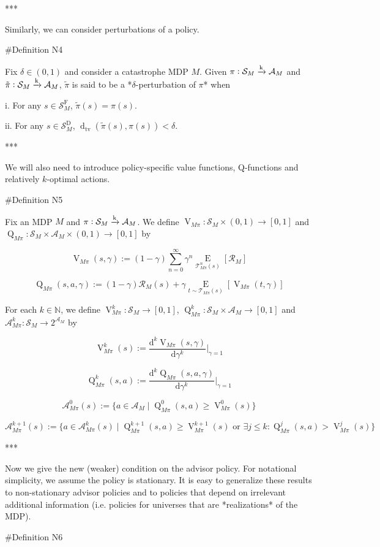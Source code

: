 \documentclass[a4paper]{article}
\newcommand{\AP}[1]{\left(#1\right)}
\newcommand{\AB}[1]{\left[#1\right]}
\newcommand{\Ea}[2]{\underset{#1}{\operatorname{E}}\AB{#2}}
\newcommand{\D}{\mathrm{d}}
\newcommand{\Dtva}[1]{\operatorname{d}_{\text{tv}}\AP{#1}}
\newcommand{\Nats}{\mathbb{N}}
\newcommand{\M}{\xrightarrow{\textnormal{k}}}
\newcommand{\A}{\mathcal{A}}
\newcommand{\St}{\mathcal{S}}
\newcommand{\T}{\mathcal{T}}
\newcommand{\R}{\mathcal{R}}
\newcommand{\RMD}{\mathrm{D}}
\newcommand{\RMF}{\mathrm{F}}
\newcommand{\SF}{\St^{\RMF}}
\newcommand{\SD}{\St^{\RMD}}
\newcommand{\V}{\operatorname{V}}
\newcommand{\Q}{\operatorname{Q}}
\begin{document}
***

Similarly, we can consider perturbations of a policy.

\#Definition N4

Fix $\delta\in(0,1)$ and consider a catastrophe MDP $M$. Given $\pi: \St_M \M \A_M$ and $\tilde{\pi}: \St_M \M \A_M$, $\tilde{\pi}$ is said to be a *$\delta$-perturbation of $\pi$* when

i. For any $s \in \SF_M$, $\tilde{\pi}(s) = \pi(s)$.

ii. For any $s \in \SD_M$, $\Dtva{\tilde{\pi}(s),\pi(s)} < \delta$.

***

We will also need to introduce policy-specific value functions, Q-functions and relatively $k$-optimal actions.

\#Definition N5

Fix an MDP $M$ and $\pi: \St_M \M \A_M$. We define $\V_{M\pi}: \St_M \times (0,1) \rightarrow [0,1]$ and $\Q_{M\pi}: \St_M \times \A_M \times (0,1) \rightarrow [0,1]$ by

$$\V_{M\pi}(s,\gamma) := (1-\gamma) \sum_{n=0}^\infty \gamma^n \Ea{\T_{M\pi}^n(s)}{\R_M}$$

$$\Q_{M\pi}(s,a,\gamma) := (1-\gamma) \R_M(s) + \gamma \Ea{t \sim \T_{M\pi}(s)}{\V_{M\pi}(t,\gamma)}$$

For each $k \in \Nats$, we define $\V_{M\pi}^k: \St_M \rightarrow [0,1]$, $\Q_{M\pi}^k: \St_M \times \A_M \rightarrow [0,1]$ and $\A_{M\pi}^k: \St_M \rightarrow 2^{\A_M}$ by

$$\V_{M\pi}^k(s) := \frac{\D^k \V_{M\pi}(s,\gamma)}{\D\gamma^k}\bigg\vert_{\gamma=1}$$

$$\Q_{M\pi}^k(s,a) := \frac{\D^k \Q_{M\pi}(s,a,\gamma)}{\D\gamma^k}\bigg\vert_{\gamma=1}$$

$$\A_{M\pi}^0(s) := \{a \in \A_M \mid \Q_{M\pi}^0(s,a) \geq \V_{M\pi}^0(s)\}$$

$$\A_{M\pi}^{k+1}(s) := \{a \in \A_{M\pi}^k(s) \mid \Q_{M\pi}^{k+1}(s,a) \geq \V_{M\pi}^{k+1}(s) \text{ or } \exists j \leq k: \Q_{M\pi}^{j}(s,a) > \V_{M\pi}^{j}(s)\}$$

***

Now we give the new (weaker) condition on the advisor policy. For notational simplicity, we assume the policy is stationary. It is easy to generalize these results to non-stationary advisor policies and to policies that depend on irrelevant additional information (i.e. policies for universes that are *realizations* of the MDP).

\#Definition N6
\end{document}
